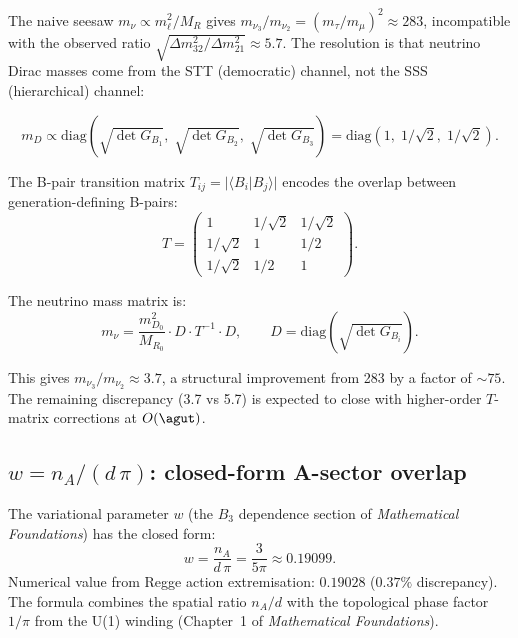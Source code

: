 The naive seesaw $m_\nu \propto m_\ell^2 / M_R$ gives $m_{\nu_3}/m_{\nu_2} = (m_\tau/m_\mu)^2 \approx 283$, incompatible with the observed ratio $\sqrt{\Delta m^2_{32}/\Delta m^2_{21}} \approx 5.7$.  The resolution is that neutrino Dirac masses come from the STT (democratic) channel, not the SSS (hierarchical) channel:

\begin{equation}
m_D \propto \text{diag}(\sqrt{\det G_{B_1}},\; \sqrt{\det G_{B_2}},\; \sqrt{\det G_{B_3}}) = \text{diag}(1,\; 1/\sqrt{2},\; 1/\sqrt{2}).
\end{equation}

The B-pair transition matrix $T_{ij} = |\langle B_i | B_j \rangle|$ encodes the overlap between generation-defining B-pairs:
\begin{equation}
T = \begin{pmatrix} 1 & 1/\sqrt{2} & 1/\sqrt{2} \\ 1/\sqrt{2} & 1 & 1/2 \\ 1/\sqrt{2} & 1/2 & 1 \end{pmatrix}.
\end{equation}

The neutrino mass matrix is:
\begin{equation}
m_\nu = \frac{m_{D_0}^2}{M_{R_0}} \cdot D \cdot T^{-1} \cdot D, \qquad D = \text{diag}(\sqrt{\det G_{B_i}}).
\end{equation}

This gives $m_{\nu_3}/m_{\nu_2} \approx 3.7$, a structural improvement from 283 by a factor of $\sim 75$.  The remaining discrepancy (3.7 vs 5.7) is expected to close with higher-order $T$-matrix corrections at $O(\agut)$.

\subsection{$w = n_A/(d\,\pi)$: closed-form A-sector overlap}
\label{sec:w_closed}

The variational parameter $w$ (the $B_3$ dependence section of \textit{Mathematical Foundations}) has the closed form:
\begin{equation}
\boxed{w = \frac{n_A}{d\,\pi} = \frac{3}{5\pi} \approx 0.19099.}
\end{equation}
Numerical value from Regge action extremisation: $0.19028$ ($0.37\%$ discrepancy).  The formula combines the spatial ratio $n_A/d$ with the topological phase factor $1/\pi$ from the U(1) winding (Chapter~1 of \textit{Mathematical Foundations}).
